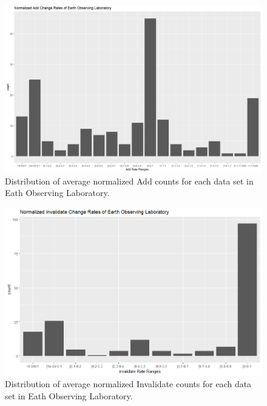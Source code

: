 \begin{figure}%
	\centering
	\includegraphics[scale=.43]{figures/Eol_Adds.png}
	\caption{Distribution of average normalized Add counts for each data set in Eath Observing Laboratory.}
	\label{EOL_Adds}
\end{figure}

\begin{figure}%
	\centering
	\includegraphics[scale=.6]{figures/Eol_Inv.png}
	\caption{Distribution of average normalized Invalidate counts for each data set in Eath Observing Laboratory.}
	\label{EOL_Invs}
\end{figure}

